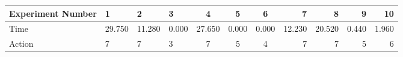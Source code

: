 \documentclass[8pt]{article}
\begin{document}
\begin{landscape}
\begin{tabular}{ | l | l | l | l | c | c | c | r | r | r | r | }
 \hline 
Experiment Number & 1 & 2 & 3 & 4 & 5 & 6 & 7 & 8 & 9 & 10\\ \hline
Time & 29.750 & 11.280 & 0.000 & 27.650 & 0.000 & 0.000 & 12.230 & 20.520 & 0.440 & 1.960\\ \hline
Action & 7 & 7 & 3 & 7 & 5 & 4 & 7 & 7 & 5 & 6\\ \hline\end{tabular}
\end{landscape}
\end{document}
